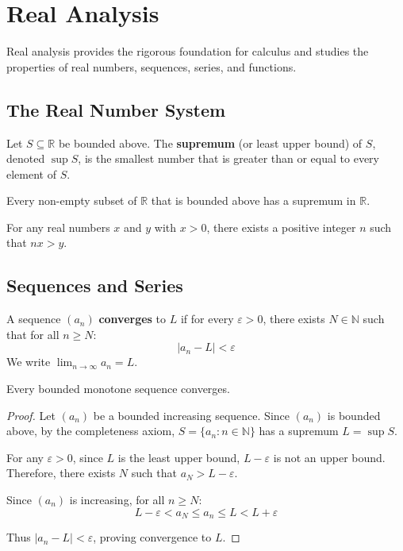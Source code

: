 \chapter{Real Analysis}

Real analysis provides the rigorous foundation for calculus and studies the properties of real numbers, sequences, series, and functions.

\section{The Real Number System}

\begin{definition}[Supremum]
Let $S \subseteq \mathbb{R}$ be bounded above. The \textbf{supremum} (or least upper bound) of $S$, denoted $\sup S$, is the smallest number that is greater than or equal to every element of $S$.
\end{definition}

\begin{theorem}
Every non-empty subset of $\mathbb{R}$ that is bounded above has a supremum in $\mathbb{R}$.
\end{theorem}

\begin{definition}
For any real numbers $x$ and $y$ with $x > 0$, there exists a positive integer $n$ such that $nx > y$.
\end{definition}

\section{Sequences and Series}

\begin{definition}
A sequence $(a_n)$ \textbf{converges} to $L$ if for every $\varepsilon > 0$, there exists $N \in \mathbb{N}$ such that for all $n \geq N$:
\[|a_n - L| < \varepsilon\]
We write $\lim_{n \to \infty} a_n = L$.
\end{definition}

\begin{theorem}
Every bounded monotone sequence converges.
\end{theorem}

\begin{proof}
Let $(a_n)$ be a bounded increasing sequence. Since $(a_n)$ is bounded above, by the completeness axiom, $S = \{a_n : n \in \mathbb{N}\}$ has a supremum $L = \sup S$.

For any $\varepsilon > 0$, since $L$ is the least upper bound, $L - \varepsilon$ is not an upper bound. Therefore, there exists $N$ such that $a_N > L - \varepsilon$.

Since $(a_n)$ is increasing, for all $n \geq N$:
\[L - \varepsilon < a_N \leq a_n \leq L < L + \varepsilon\]

Thus $|a_n - L| < \varepsilon$, proving convergence to $L$.
\end{proof}

